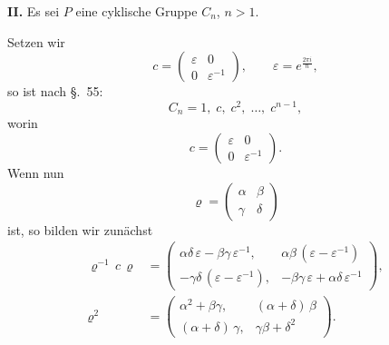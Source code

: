 \documentclass[12pt,a4paper]{article}
\begin{document}
\medskip\noindent
\textbf{II.} Es sei $P$ eine cyklische Gruppe $C_{n}$, $n > 1$.

Setzen wir
\begin{equation}\label{eq:62.3}
\tag{3}
c = \begin{pmatrix}\varepsilon&0\\0&\varepsilon^{-1}\end{pmatrix},\qquad
\varepsilon = e^{\frac{2\pi i}{n}},
\end{equation}
so ist nach \S.~55:
\begin{equation}\label{eq:62.4}
\tag{4}
C_{n} = 1,\; c,\; c^{2},\; \ldots,\; c^{n-1},
\end{equation}
worin
\[
c = \begin{pmatrix}\varepsilon&0\\0&\varepsilon^{-1}\end{pmatrix}.
\]
Wenn nun
\[
\varrho = \begin{pmatrix}\alpha&\beta\\\gamma&\delta\end{pmatrix}
\]
ist, so bilden wir zunächst
\begin{align}
\label{eq:62.5}\tag{5}
\varrho^{-1}\,c\,\varrho &=
\begin{pmatrix}
\alpha\delta\,\varepsilon - \beta\gamma\,\varepsilon^{-1},&
\alpha\beta\,(\varepsilon - \varepsilon^{-1})\\
-\gamma\delta\,(\varepsilon - \varepsilon^{-1}),&
-\beta\gamma\,\varepsilon + \alpha\delta\,\varepsilon^{-1}
\end{pmatrix},\\
\label{eq:62.6}\tag{6}
\varrho^{2} &=
\begin{pmatrix}
\alpha^{2} + \beta\gamma,&
(\alpha + \delta)\,\beta\\
(\alpha + \delta)\,\gamma,&
\gamma\beta + \delta^{2}
\end{pmatrix}.
\end{align}
\end{document}
